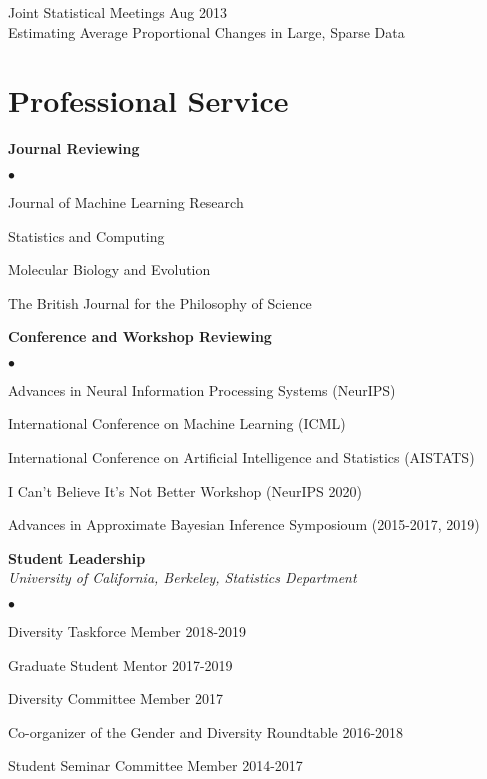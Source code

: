 \documentclass[margin,line]{res}
\newenvironment{list2}{
  \begin{list}{$\bullet$}{%
      \setlength{\itemsep}{0in}
      \setlength{\parsep}{0in} \setlength{\parskip}{0in}
      \setlength{\topsep}{0in} \setlength{\partopsep}{0in}
      \setlength{\leftmargin}{0.2in}}}{\end{list}}
\begin{document}
\begin{resume}
Joint Statistical Meetings \hfill Aug 2013\\
Estimating Average Proportional Changes in Large, Sparse Data

\pagebreak

\section{\sc Professional Service}

\textbf{Journal Reviewing}
\begin{list2}
\item Journal of Machine Learning Research
\item Statistics and Computing %
\item Molecular Biology and Evolution %
\item The British Journal for the Philosophy of Science %
\end{list2}

\textbf{Conference and Workshop Reviewing}
\begin{list2}
\item Advances in Neural Information Processing Systems (NeurIPS)
\item International Conference on Machine Learning (ICML) %
\item International Conference on Artificial Intelligence and Statistics (AISTATS)
%
\item I Can't Believe It's Not Better Workshop (NeurIPS 2020)
\item Advances in Approximate Bayesian Inference Symposioum (2015-2017, 2019)
\end{list2}

\textbf{Student Leadership}\\
{\em University of California, Berkeley, Statistics Department}
\begin{list2}
    \item Diversity Taskforce Member \hfill 2018-2019
    \item Graduate Student Mentor \hfill 2017-2019
    \item Diversity Committee Member  \hfill 2017
    \item Co-organizer of the Gender and Diversity Roundtable \hfill 2016-2018
    \item Student Seminar Committee Member \hfill 2014-2017
\end{list2}


\end{resume}
\end{document}
